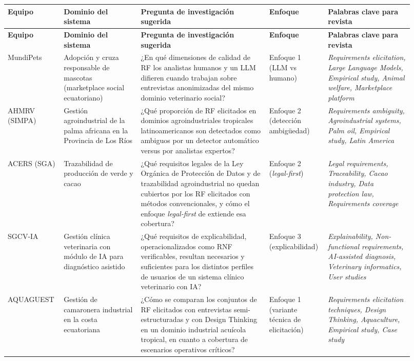\documentclass[11pt,a4paper]{article}
\newcommand{\hh}[1]{\cellcolor{uteqgreen}\textbf{\color{white}\small #1}}
\begin{document}
\begin{longtable}{@{}p{0.115\linewidth} p{0.185\linewidth} p{0.30\linewidth} p{0.12\linewidth} p{0.20\linewidth}@{}}
    \hh{Equipo} & \hh{Dominio del sistema} & \hh{Pregunta de investigación sugerida} & \hh{Enfoque} & \hh{Palabras clave para revista}\\
    \endfirsthead
    \hh{Equipo} & \hh{Dominio del sistema} & \hh{Pregunta de investigación sugerida} & \hh{Enfoque} & \hh{Palabras clave para revista}\\
    \endhead
    MundiPets & Adopción y cruza responsable de mascotas (marketplace social ecuatoriano) & ¿En qué dimensiones de calidad de RF los analistas humanos y un LLM difieren cuando trabajan sobre entrevistas anonimizadas del mismo dominio veterinario social? & Enfoque 1 (LLM vs humano) & \emph{Requirements elicitation, Large Language Models, Empirical study, Animal welfare, Marketplace platform}\\
    AHMRV (SIMPA) & Gestión agroindustrial de la palma africana en la Provincia de Los Ríos & ¿Qué proporción de RF elicitados en dominios agroindustriales tropicales latinoamericanos son detectados como ambiguos por un detector automático versus por analistas expertos? & Enfoque 2 (detección ambigüedad) & \emph{Requirements ambiguity, Agroindustrial systems, Palm oil, Empirical study, Latin America}\\
    ACERS (SGA) & Trazabilidad de producción de verde y cacao & ¿Qué requisitos legales de la Ley Orgánica de Protección de Datos y de trazabilidad agroindustrial no quedan cubiertos por los RF elicitados con métodos convencionales, y cómo el enfoque \emph{legal-first} de \cite{amaral2020legal} extiende esa cobertura? & Enfoque 2 (\emph{legal-first}) & \emph{Legal requirements, Traceability, Cacao industry, Data protection law, Requirements coverage}\\
    SGCV-IA & Gestión clínica veterinaria con módulo de IA para diagnóstico asistido & ¿Qué requisitos de explicabilidad, operacionalizados como RNF verificables, resultan necesarios y suficientes para los distintos perfiles de usuarios de un sistema clínico veterinario con IA? & Enfoque 3 (explicabilidad) & \emph{Explainability, Non-functional requirements, AI-assisted diagnosis, Veterinary informatics, User studies}\\
    AQUAGUEST & Gestión de camaronera industrial en la costa ecuatoriana & ¿Cómo se comparan los conjuntos de RF elicitados con entrevistas semi-estructuradas y con Design Thinking en un dominio industrial acuícola tropical, en cuanto a cobertura de escenarios operativos críticos? & Enfoque 1 (variante técnica de elicitación) & \emph{Requirements elicitation techniques, Design Thinking, Aquaculture, Empirical study, Case study}\\

\end{longtable}
\end{document}
